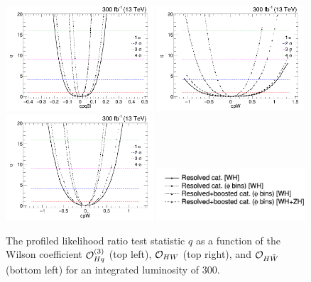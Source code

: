 \documentclass[a4paper,11pt]{article}
\begin{document}
\begin{figure}[hbtp]
\begin{center}
\includegraphics[width=0.49\textwidth]{Figures/New/RECO/Full_NLL_WC_cpq3i_2019_opt2.png}
\includegraphics[width=0.49\textwidth]{Figures/New/RECO/Full_NLL_WC_cpW_2019_opt2.png}
\includegraphics[width=0.49\textwidth]{Figures/New/RECO/Full_NLL_WC_cpWtilde_2019_opt2.png}
\includegraphics[width=0.495\textwidth]{Figures/New/RECO/Selection_276.png}
\end{center}
\caption{
The profiled likelihood ratio test statistic $q$
as a function of the Wilson coefficient ${\cal O}^{(3)}_{Hq}$ (top left), ${\cal O}_{HW}$ (top right), and ${\cal O}_{H\tilde{W}}$ (bottom left) for an integrated luminosity of 300\fbinv.
}
\label{fig:NLL}
\end{figure}
\end{document}
